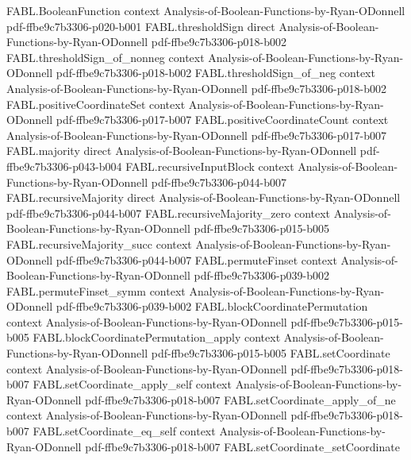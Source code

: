 \begin{theorem}
\proofstep
  {FABL.BooleanFunction}
  {context}
  {Analysis-of-Boolean-Functions-by-Ryan-ODonnell}
  {pdf-ffbe9c7b3306-p020-b001}
\proofstep
  {FABL.thresholdSign}
  {direct}
  {Analysis-of-Boolean-Functions-by-Ryan-ODonnell}
  {pdf-ffbe9c7b3306-p018-b002}
\proofstep
  {FABL.thresholdSign_of_nonneg}
  {context}
  {Analysis-of-Boolean-Functions-by-Ryan-ODonnell}
  {pdf-ffbe9c7b3306-p018-b002}
\proofstep
  {FABL.thresholdSign_of_neg}
  {context}
  {Analysis-of-Boolean-Functions-by-Ryan-ODonnell}
  {pdf-ffbe9c7b3306-p018-b002}
\proofstep
  {FABL.positiveCoordinateSet}
  {context}
  {Analysis-of-Boolean-Functions-by-Ryan-ODonnell}
  {pdf-ffbe9c7b3306-p017-b007}
\proofstep
  {FABL.positiveCoordinateCount}
  {context}
  {Analysis-of-Boolean-Functions-by-Ryan-ODonnell}
  {pdf-ffbe9c7b3306-p017-b007}
\proofstep
  {FABL.majority}
  {direct}
  {Analysis-of-Boolean-Functions-by-Ryan-ODonnell}
  {pdf-ffbe9c7b3306-p043-b004}
\proofstep
  {FABL.recursiveInputBlock}
  {context}
  {Analysis-of-Boolean-Functions-by-Ryan-ODonnell}
  {pdf-ffbe9c7b3306-p044-b007}
\proofstep
  {FABL.recursiveMajority}
  {direct}
  {Analysis-of-Boolean-Functions-by-Ryan-ODonnell}
  {pdf-ffbe9c7b3306-p044-b007}
\proofstep
  {FABL.recursiveMajority_zero}
  {context}
  {Analysis-of-Boolean-Functions-by-Ryan-ODonnell}
  {pdf-ffbe9c7b3306-p015-b005}
\proofstep
  {FABL.recursiveMajority_succ}
  {context}
  {Analysis-of-Boolean-Functions-by-Ryan-ODonnell}
  {pdf-ffbe9c7b3306-p044-b007}
\proofstep
  {FABL.permuteFinset}
  {context}
  {Analysis-of-Boolean-Functions-by-Ryan-ODonnell}
  {pdf-ffbe9c7b3306-p039-b002}
\proofstep
  {FABL.permuteFinset_symm}
  {context}
  {Analysis-of-Boolean-Functions-by-Ryan-ODonnell}
  {pdf-ffbe9c7b3306-p039-b002}
\proofstep
  {FABL.blockCoordinatePermutation}
  {context}
  {Analysis-of-Boolean-Functions-by-Ryan-ODonnell}
  {pdf-ffbe9c7b3306-p015-b005}
\proofstep
  {FABL.blockCoordinatePermutation_apply}
  {context}
  {Analysis-of-Boolean-Functions-by-Ryan-ODonnell}
  {pdf-ffbe9c7b3306-p015-b005}
\proofstep
  {FABL.setCoordinate}
  {context}
  {Analysis-of-Boolean-Functions-by-Ryan-ODonnell}
  {pdf-ffbe9c7b3306-p018-b007}
\proofstep
  {FABL.setCoordinate_apply_self}
  {context}
  {Analysis-of-Boolean-Functions-by-Ryan-ODonnell}
  {pdf-ffbe9c7b3306-p018-b007}
\proofstep
  {FABL.setCoordinate_apply_of_ne}
  {context}
  {Analysis-of-Boolean-Functions-by-Ryan-ODonnell}
  {pdf-ffbe9c7b3306-p018-b007}
\proofstep
  {FABL.setCoordinate_eq_self}
  {context}
  {Analysis-of-Boolean-Functions-by-Ryan-ODonnell}
  {pdf-ffbe9c7b3306-p018-b007}
\proofstep
  {FABL.setCoordinate_setCoordinate}

\end{theorem}
